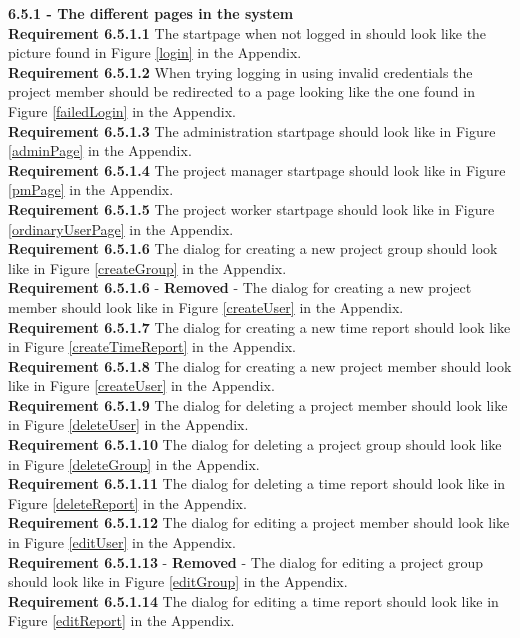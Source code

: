 \documentclass{article}
\begin{document}
{\fontsize{11}{11}\selectfont \noindent\textbf{6.5.1 - The different pages in the system}} \\
\noindent\textbf{Requirement 6.5.1.1} The startpage when not logged in should look like the picture found in Figure \ref{login} in the Appendix. \\
\noindent\textbf{Requirement 6.5.1.2} When trying logging in using invalid credentials the project member should be redirected to a page looking like the one found in Figure \ref{failedLogin} in the Appendix. \\
\noindent\textbf{Requirement 6.5.1.3} The administration startpage should look like in Figure \ref{adminPage} in the Appendix. \\
\noindent\textbf{Requirement 6.5.1.4} The project manager startpage should look like in Figure \ref{pmPage} in the Appendix. \\
\noindent\textbf{Requirement 6.5.1.5} The project worker startpage  should look like in Figure \ref{ordinaryUserPage} in the Appendix. \\
\noindent\textbf{Requirement 6.5.1.6} The dialog for creating a new project group should look like in Figure \ref{createGroup} in the Appendix. \\
\noindent\textbf{Requirement 6.5.1.6} - \textbf{Removed} - The dialog for creating a new project member should look like in Figure \ref{createUser} in the Appendix. \\
\noindent\textbf{Requirement 6.5.1.7} The dialog for creating a new time report should look like in Figure \ref{createTimeReport} in the Appendix. \\
\noindent\textbf{Requirement 6.5.1.8} The dialog for creating a new project member should look like in Figure \ref{createUser} in the Appendix. \\
\noindent\textbf{Requirement 6.5.1.9} The dialog for deleting a project member should look like in Figure \ref{deleteUser} in the Appendix. \\
\noindent\textbf{Requirement 6.5.1.10} The dialog for deleting a project group should look like in Figure \ref{deleteGroup} in the Appendix. \\
\noindent\textbf{Requirement 6.5.1.11} The dialog for deleting a time report should look like in Figure \ref{deleteReport} in the Appendix. \\
\noindent\textbf{Requirement 6.5.1.12} The dialog for editing a project member should look like in Figure \ref{editUser} in the Appendix. \\
\noindent\textbf{Requirement 6.5.1.13} - \textbf{Removed} - The dialog for editing a project group should look like in Figure \ref{editGroup} in the Appendix. \\
\noindent\textbf{Requirement 6.5.1.14} The dialog for editing a time report should look like in Figure \ref{editReport} in the Appendix. \\
%
%
\end{document}

